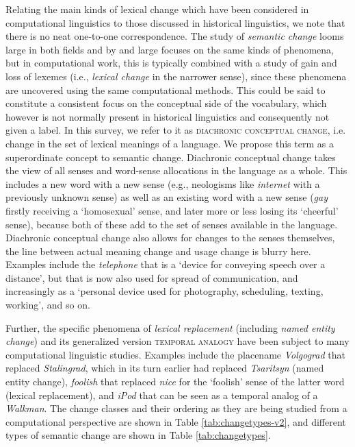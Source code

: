 \documentclass[output=paper]{langsci/langscibook}
\begin{document}
Relating the main kinds of lexical change which have been considered in computational linguistics to those discussed in historical linguistics, we note that there is no neat one-to-one correspondence. The study of \emph{semantic change} looms large in both fields and by and large focuses on the same kinds of phenomena, but in computational work, this is typically combined with a study of gain and loss of lexemes (i.e., \emph{lexical change} in the narrower sense), since these phenomena are uncovered using the same computational methods. This could be said to constitute a consistent focus on the conceptual side of the vocabulary, which however is not normally present in historical linguistics and consequently not given a label. In this survey, we refer to it as \textsc{diachronic conceptual change}, i.e. change in the set of lexical meanings of a language. We propose this term as a superordinate concept to semantic change. Diachronic conceptual change takes the view of all senses and word-sense allocations in the language as a whole. This includes a new word with a new sense (e.g., neologisms like \emph{internet} with a previously unknown sense) as well as an existing word with a new sense (\emph{gay} firstly receiving a `homosexual' sense, and later more or less losing its `cheerful' sense), because both of these add to the set of senses available in the language. Diachronic conceptual change also allows for changes to the senses themselves, the line between actual meaning change and usage change is blurry here. Examples include the \emph{telephone} that is a `device for conveying speech over a distance', but that is now also used for spread of communication, and increasingly as a `personal device used for photography, scheduling, texting, working', and so on. 

Further, the specific phenomena of \emph{lexical replacement} (including \emph{named entity change}) and its generalized version \textsc{temporal analogy} have been subject to many computational linguistic studies.  Examples include the placename \emph{Volgograd} that replaced \emph{Stalingrad}, which in its turn earlier had replaced \emph{Tsaritsyn} (named entity change), \emph{foolish} that replaced \emph{nice} for the `foolish' sense of the latter word (lexical replacement), and \emph{iPod} that can be seen as a temporal analog of a \emph{Walkman}.
The change classes and their ordering as they are being studied from a computational perspective are shown in Table \ref{tab:changetypes-v2}, and different types of semantic change are shown in Table \ref{tab:changetypes}.
\end{document}

